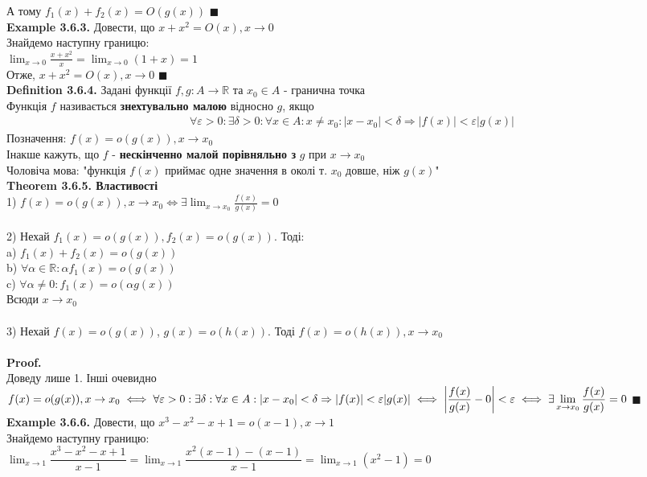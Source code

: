 \documentclass[a4paper, 14pt]{extarticle}
\def\huge{\displaystyle}
\def\bigline{\vspace{5mm}\\}
\def\defin#1{\textbf{Definition {#1}}}
\def\ex#1{\textbf{Example {#1}}}
\def\th#1{\textbf{Theorem {#1}}}
\def\proof{\textbf{Proof.}\\}
\def\bigline{\vspace{5mm}\\}
\def\qed{$\blacksquare$}
\begin{document}
А тому $f_1(x) + f_2(x) = O(g(x))$ \qed
\bigline
\ex{3.6.3.} Довести, що $x+x^2 = O(x), x \to 0$\\
Знайдемо наступну границю:\\
$\huge \lim_{x \to 0} \frac{x+x^2}{x} = \lim_{x \to 0}(1+x) = 1$\\
Отже, $x+x^2 = O(x), x \to 0$ \qed
\bigline
\defin{3.6.4.} Задані функції $f,g: A \to \mathbb{R}$ та $x_0 \in A$ - гранична точка\\
Функція $f$ називається \textbf{знехтувально малою} відносно $g$, якщо
\begin{align*}
\forall \varepsilon>0: \exists \delta > 0: \forall x \in A: x \neq x_0: |x-x_0| < \delta \Rightarrow |f(x)| < \varepsilon |g(x)|
\end{align*}
Позначення: $f(x) = o(g(x)), x \to x_0$\\
Інакше кажуть, що $f$ - \textbf{нескінченно малой порівняльно з} $g$ при $x \to x_0$\\
Чоловіча мова: "функція $f(x)$ приймає одне значення в околі т. $x_0$ довше, ніж $g(x)$"
\bigline
\th{3.6.5. Властивості}\\
1) $f(x) = o(g(x)), x \to x_0 \iff \huge \exists \lim_{x \to x_0} \frac{f(x)}{g(x)} = 0$\\
\\
2) Нехай $f_1(x) = o(g(x)), f_2(x) = o(g(x))$. Тоді:\\
a) $f_1(x) + f_2(x) = o(g(x))$\\
b) $\forall \alpha \in \mathbb{R}: \alpha f_1(x) = o(g(x))$\\
c) $\forall \alpha \neq 0: f_1(x) = o(\alpha g(x))$\\
Всюди $x \to x_0$\\
\\
3) Нехай $f(x) = o(g(x))$, $g(x) = o(h(x))$. Тоді $f(x) = o(h(x)), x \to x_0$\\
\\
\proof
Доведу лише 1. Інші очевидно\\
$f(x) = o(g(x)),x \to x_0 \iff \forall \varepsilon>0: \exists \delta: \forall x \in A: |x-x_0| < \delta \Rightarrow |f(x)| < \varepsilon |g(x)| \iff \huge \abs{\frac{f(x)}{g(x)} - 0} < \varepsilon \iff \exists \lim_{x \to x_0} \frac{f(x)}{g(x)} = 0$ \qed
\bigline
\ex{3.6.6.} Довести, що $x^3 - x^2 - x + 1 = o(x-1), x \to 1$\\
Знайдемо наступну границю:\\
$\huge \lim_{x \to 1} \dfrac{x^3-x^2-x+1}{x-1} = \lim_{x \to 1} \dfrac{x^2(x-1)-(x-1)}{x-1} = \lim_{x \to 1} (x^2-1) = 0$\\
\end{document}
